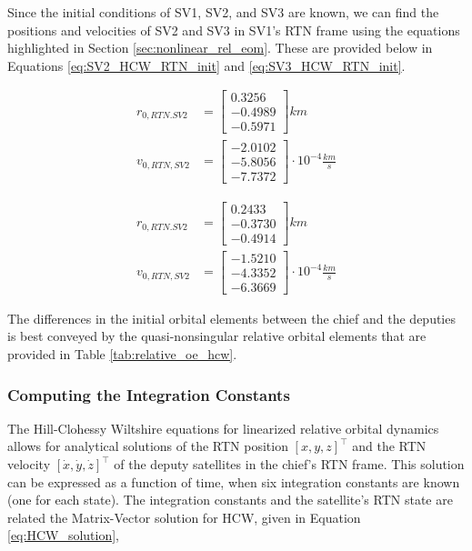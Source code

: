 Since the initial conditions of SV1, SV2, and SV3 are known, we can find the positions and velocities of SV2 and SV3 in SV1's RTN frame using the equations highlighted in Section \ref{sec:nonlinear_rel_eom}. These are provided below in Equations \ref{eq:SV2_HCW_RTN_init} and \ref{eq:SV3_HCW_RTN_init}.

\begin{align} \label{eq:SV2_HCW_RTN_init}
    r_{0, RTN. SV2} &= \begin{bmatrix}
        0.3256 \\
        -0.4989 \\
        -0.5971
    \end{bmatrix} km \\
    v_{0, RTN, SV2} &= \begin{bmatrix}
        -2.0102 \\
        -5.8056 \\
        -7.7372
    \end{bmatrix}\cdot 10^{-4} \frac{km}{s}
\end{align}

\begin{align} \label{eq:SV3_HCW_RTN_init}
    r_{0, RTN. SV2} &= \begin{bmatrix}
        0.2433 \\
        -0.3730 \\
        -0.4914
    \end{bmatrix} km \\
    v_{0, RTN, SV2} &= \begin{bmatrix}
        -1.5210 \\
        -4.3352 \\
        -6.3669
    \end{bmatrix}\cdot 10^{-4} \frac{km}{s}
\end{align}

The differences in the initial orbital elements between the chief and the deputies is best conveyed by the quasi-nonsingular relative orbital elements that are provided in Table \ref{tab:relative_oe_hcw}.

\subsubsection{Computing the Integration Constants}

The Hill-Clohessy Wiltshire equations for linearized relative orbital dynamics allows for analytical solutions of the RTN position $[x, y, z]^\top$ and the RTN velocity $[\dot{x}, \dot{y}, \dot{z}]^\top$ of the deputy satellites in the chief's RTN frame. This solution can be expressed as a function of time, when six integration constants are known (one for each state). The integration constants and the satellite's RTN state are related the Matrix-Vector solution for HCW, given in Equation \ref{eq:HCW_solution}, 


